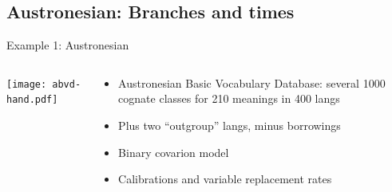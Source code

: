 \documentclass[9pt]{beamer}
\begin{document}
\subsection{Austronesian: Branches and times}
\begin{frame}{Example 1: Austronesian}
  \begin{columns}
    \begin{column}{0.5\textwidth}
      \footnotemark\texttt{[image: abvd-hand.pdf]}
    \end{column}
    \begin{column}{0.5\textwidth}
      \begin{itemize}
      \item Austronesian Basic Vocabulary Database: several 1000 cognate classes for 210 meanings in 400 langs
      \item Plus two “outgroup” langs, minus borrowings
      \item Binary covarion model
      \item Calibrations and variable replacement rates
      \end{itemize}
    \end{column}
  \end{columns}
\end{frame}
\end{document}
